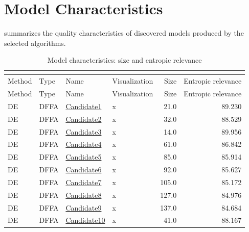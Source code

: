 \documentclass{article}
\begin{document}
\section{Model Characteristics}
\label{sec:model:charaxteristics}
 summarizes the quality characteristics of discovered models produced by the selected algorithms.
\begin{longtable}{llllrr}
\caption{Model characteristics: size and entropic relevance}
\setlength{\tabcolsep}{6pt}
\fontsize{8}{10}\selectfont
\label{tbl:models} \\ 
\toprule
Method & Type & Name & Visualization & Size & Entropic relevance \\ 
\endfirsthead
\midrule
\toprule
Method & Type & Name & Visualization & Size & Entropic relevance \\ 
\midrule
\endhead
DE&DFFA &\href{C:/Users/hootanz/eclipse-workspace/processICPM/20251209_205430/DFFA/DE/candidate1.dffa}{Candidate1} & x &21.0&89.230\\
DE&DFFA &\href{C:/Users/hootanz/eclipse-workspace/processICPM/20251209_205430/DFFA/DE/candidate2.dffa}{Candidate2} & x &32.0&88.529\\
DE&DFFA &\href{C:/Users/hootanz/eclipse-workspace/processICPM/20251209_205430/DFFA/DE/candidate3.dffa}{Candidate3} & x &14.0&89.956\\
DE&DFFA &\href{C:/Users/hootanz/eclipse-workspace/processICPM/20251209_205430/DFFA/DE/candidate4.dffa}{Candidate4} & x &61.0&86.842\\
DE&DFFA &\href{C:/Users/hootanz/eclipse-workspace/processICPM/20251209_205430/DFFA/DE/candidate5.dffa}{Candidate5} & x &85.0&85.914\\
DE&DFFA &\href{C:/Users/hootanz/eclipse-workspace/processICPM/20251209_205430/DFFA/DE/candidate6.dffa}{Candidate6} & x &92.0&85.627\\
DE&DFFA &\href{C:/Users/hootanz/eclipse-workspace/processICPM/20251209_205430/DFFA/DE/candidate7.dffa}{Candidate7} & x &105.0&85.172\\
DE&DFFA &\href{C:/Users/hootanz/eclipse-workspace/processICPM/20251209_205430/DFFA/DE/candidate8.dffa}{Candidate8} & x &127.0&84.976\\
DE&DFFA &\href{C:/Users/hootanz/eclipse-workspace/processICPM/20251209_205430/DFFA/DE/candidate9.dffa}{Candidate9} & x &137.0&84.684\\
DE&DFFA &\href{C:/Users/hootanz/eclipse-workspace/processICPM/20251209_205430/DFFA/DE/candidate10.dffa}{Candidate10} & x &41.0&88.167\\

\end{longtable}
\end{document}
